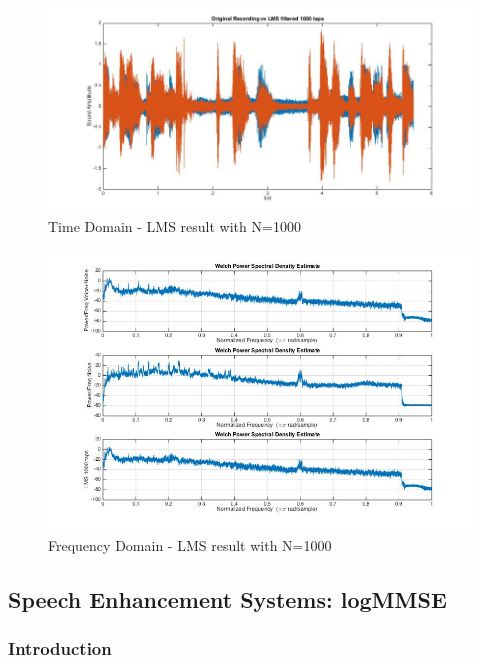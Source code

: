 \documentclass[11pt,a4paper,english]{book}  %
\theoremstyle{definition}  %
\theoremstyle{plain}  %
\theoremstyle{remark}  %
\begin{document}
		\begin{figure}[h]
		\centering
		\includegraphics[width=15cm]{images/theory/lms1000tapstime.jpg}
		\caption{Time Domain - LMS result with N=1000}
		\label{fig:lmstime1000}
		\end{figure}
		
		
		\begin{figure}[h]
		\centering
		\includegraphics[width=15cm]{images/theory/lms100tapsfreq.jpg}
		\caption{Frequency Domain - LMS result with N=1000}
		\label{fig:lmsfreq1000}
		\end{figure}
		
		
	\subsection{Speech Enhancement Systems: logMMSE}
	\label{sec:enhancement}
	
	\subsubsection{Introduction}
	
\end{document}
